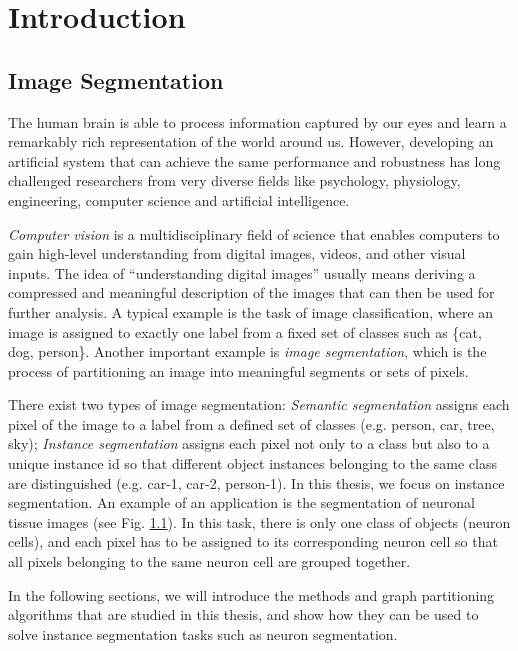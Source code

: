 
\chapter{Introduction}

\section{Image Segmentation}
The human brain is able to process information captured by our eyes and learn a remarkably rich representation of the world around us. However, developing an artificial system that can achieve the same performance and robustness has long challenged researchers from very diverse fields like psychology, physiology, engineering, computer science and artificial intelligence.

\emph{Computer vision} is a multidisciplinary field of science that enables computers to gain high-level understanding from digital images, videos, and other visual inputs. 
The idea of ``understanding digital images'' usually means deriving a compressed and meaningful description of the images that can then be used for further analysis.
A typical example is the task of image classification, where an image is assigned to exactly one label from a fixed set of classes such as \{cat, dog, person\}. 
Another important example is \emph{image segmentation}, which is the process of partitioning an image into meaningful segments or sets of pixels. 

There exist two types of image segmentation: \emph{Semantic segmentation} assigns each pixel of the image to a label from a defined set of classes (e.g. person, car, tree, sky); \emph{Instance segmentation} assigns each pixel not only to a class but also to a unique instance id so that different object instances belonging to the same class are distinguished (e.g. car-1, car-2, person-1). 
In this thesis, we focus on instance segmentation. An example of an application is the segmentation of neuronal tissue images (see Fig. \ref{}). In this task, there is only one class of objects (neuron cells), and each pixel has to be assigned to its corresponding neuron cell so that all pixels belonging to the same neuron cell are grouped together. 

In the following sections, we will introduce the methods and graph partitioning algorithms that are studied in this thesis, and show how they can be used to solve instance segmentation tasks such as neuron segmentation.


